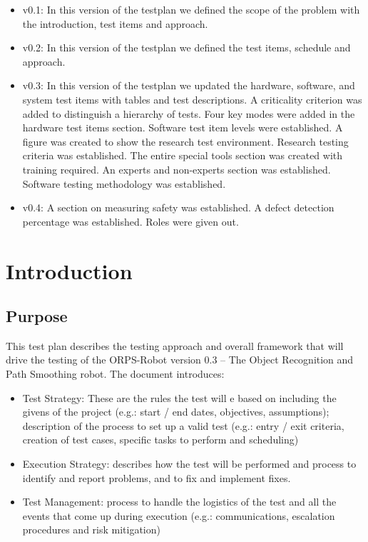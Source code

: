 \documentclass[english,12pt]{article}
\begin{document}
\begin{itemize}
	\item v0.1: In this version of the testplan we defined the  
    scope of the problem with the introduction, test items and 
    approach.
    \item v0.2: In this version of the testplan we defined the  
    test items, schedule and approach.
    \item v0.3: In this version of the testplan we updated 
    the hardware, software, and system test items with 
    tables and test descriptions. A criticality criterion 
    was added to distinguish a hierarchy of tests. Four key 
    modes were added in the hardware test items section. 
    Software test item levels were established. A figure 
    was created to show the research test environment. 
    Research testing criteria was established. The entire 
    special tools section was created with training required.
    An experts and non-experts section was established.
    Software testing methodology was established.
    \item v0.4: A section on measuring safety was established.
    A defect detection percentage was established.
    Roles were given out.
\end{itemize}


\section{Introduction}
\subsection{Purpose}
This test plan describes the testing approach and overall 
framework that will drive the testing of the ORPS-Robot 
version 0.3 – The Object Recognition and Path Smoothing 
robot. The document introduces:
\begin{itemize}
	\item[] Test Strategy: These are the rules the test will e based on including 
    the givens of the project (e.g.: start / end dates, objectives, assumptions); 
    description of the process to set up a valid test (e.g.: entry / exit criteria, 
    creation of test cases, specific tasks to perform and scheduling)
	\item[] Execution Strategy: describes how the test will be performed 
    and process to identify and report problems, and to fix and implement 
    fixes.
    \item[] Test Management: process to handle the logistics of the test 
    and all the events that come up during execution (e.g.: communications, 
    escalation procedures and risk mitigation)
\end{itemize}
\end{document}
